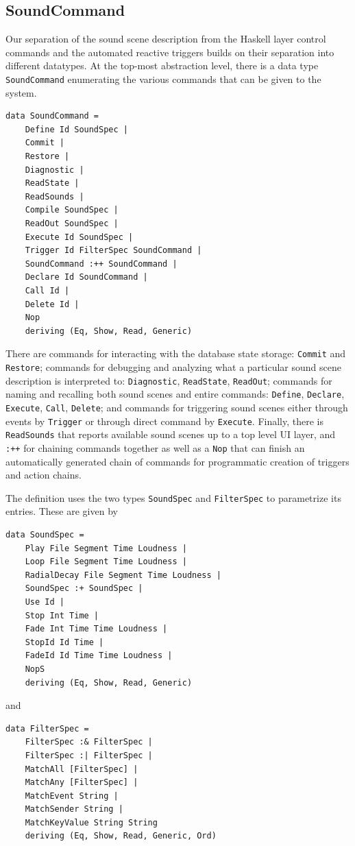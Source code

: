 \subsection{SoundCommand}
\label{sec:soundspec}

Our separation of the sound scene description from the Haskell layer
control commands and the automated reactive triggers builds on their
separation into different datatypes.  At the top-most abstraction
level, there is a data type \texttt{SoundCommand} enumerating the
various commands that can be given to the system. 

\begin{verbatim}
data SoundCommand = 
    Define Id SoundSpec |
    Commit | 
    Restore | 
    Diagnostic |
    ReadState |
    ReadSounds | 
    Compile SoundSpec |
    ReadOut SoundSpec | 
    Execute Id SoundSpec |
    Trigger Id FilterSpec SoundCommand |
    SoundCommand :++ SoundCommand |
    Declare Id SoundCommand |
    Call Id | 
    Delete Id | 
    Nop
    deriving (Eq, Show, Read, Generic)
\end{verbatim}

There are commands for interacting with the database state storage:
\texttt{Commit} and \texttt{Restore}; commands for debugging and
analyzing what a particular sound scene description is interpreted to:
\texttt{Diagnostic}, \texttt{ReadState}, \texttt{ReadOut}; commands
for naming and recalling both sound scenes and entire commands:
\texttt{Define}, \texttt{Declare}, \texttt{Execute}, \texttt{Call},
\texttt{Delete}; and commands for triggering sound scenes either
through events by \texttt{Trigger} or through direct command by
\texttt{Execute}. Finally, there is \texttt{ReadSounds} that reports
available sound scenes up to a top level UI layer, and
\texttt{:++} for chaining commands together as well as a \texttt{Nop}
that can finish an automatically generated chain of commands for
programmatic creation of triggers and action chains. 

The definition uses the two types \texttt{SoundSpec} and
\texttt{FilterSpec} to parametrize its entries. These are given by

\begin{verbatim}
data SoundSpec = 
    Play File Segment Time Loudness |
    Loop File Segment Time Loudness |
    RadialDecay File Segment Time Loudness | 
    SoundSpec :+ SoundSpec | 
    Use Id |
    Stop Int Time |
    Fade Int Time Time Loudness |
    StopId Id Time |
    FadeId Id Time Time Loudness |
    NopS
    deriving (Eq, Show, Read, Generic)
\end{verbatim}
and
\begin{verbatim}
data FilterSpec = 
    FilterSpec :& FilterSpec |
    FilterSpec :| FilterSpec |
    MatchAll [FilterSpec] |
    MatchAny [FilterSpec] |
    MatchEvent String |
    MatchSender String |
    MatchKeyValue String String
    deriving (Eq, Show, Read, Generic, Ord)
\end{verbatim}

